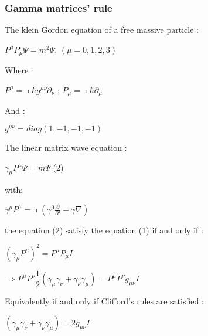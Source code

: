 \begin{frame}[allowframebreaks]
 \frametitle{Gamma matrices' rule}
\begin{itemize}
\item The klein Gordon equation of a free massive particle :
  \begin{center}
    $P^\mu P_\mu \Psi = m^2 \Psi$, \qquad  $(\mu=0,1,2,3)$
  \end{center}
  Where :
  \begin{center}
    $P^\mu = \imath \hbar g^{\mu\nu} \partial_\nu $  \qquad; \quad $P_\mu = \imath \hbar \partial_\mu$
  \end{center}
  And :
  \begin{center}
    $g^{\mu\nu}= diag(1,-1,-1,-1)$   
  \end{center}
  \item The linear matrix wave equation :
  \begin{center}
    $\gamma_\mu P^\mu \Psi= m\Psi$   \qquad (2)
  \end{center}
  with:
  \begin{center}
    $\gamma^\mu P^\mu = \imath (\gamma^0 \frac{\partial}{\partial t} +\gamma \nabla)$\\
  \end{center}
  the equation (2) satisfy the equation (1) if and only if :
  \begin{center}
    $ (\gamma_\mu P^\mu)^2=P^\mu P_\mu I$  \\
  \end{center}
  \begin{center}
    $\Longrightarrow P^\mu P^\nu \dfrac{1}{2}(\gamma_\mu \gamma_\nu +\gamma_\nu \gamma_\mu )=P^\mu P^\nu g_{\mu\nu} I$
  \end{center}
  Equivalently if and only if Clifford's rules are satisfied :
  \begin{center}
  \item  $(\gamma_\mu \gamma_\nu +\gamma_\nu \gamma_\mu )=2 g_{\mu\nu} I$
  \end{center}
\end{itemize}
\end{frame}
